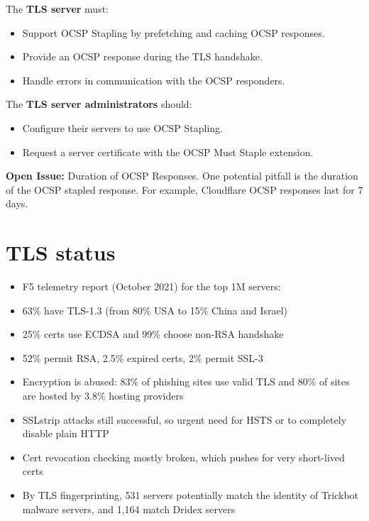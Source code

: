 The \textbf{TLS server} must:
\begin{itemize}
    \item Support OCSP Stapling by prefetching and caching OCSP responses.
    \item Provide an OCSP response during the TLS handshake.
    \item Handle errors in communication with the OCSP responders.
\end{itemize}


The \textbf{TLS server administrators} should:
\begin{itemize}
    \item Configure their servers to use OCSP Stapling.
    \item Request a server certificate with the OCSP Must Staple extension.
\end{itemize}

\textbf{Open Issue:} Duration of OCSP Responses. One potential pitfall is the duration of the OCSP stapled response. For example, Cloudflare OCSP responses last for 7 days.

\section{TLS status}
\begin{itemize}[itemsep=0pt]
    \item F5 telemetry report (October 2021) for the top 1M servers:
    \item 63\% have TLS-1.3 (from 80\% USA to 15\% China and Israel)
    \item 25\% certs use ECDSA and 99\% choose non-RSA handshake
    \item 52\% permit RSA, 2.5\% expired certs, 2\% permit SSL-3
    \item Encryption is abused: 83\% of phishing sites use valid TLS and 80\% of sites are hosted by 3.8\% hosting providers
    \item SSLstrip attacks still successful, so urgent need for HSTS or to completely disable plain HTTP
    \item Cert revocation checking mostly broken, which pushes for very short-lived certs
    \item By TLS fingerprinting, 531 servers potentially match the identity of Trickbot malware servers, and 1,164 match Dridex servers
\end{itemize}

